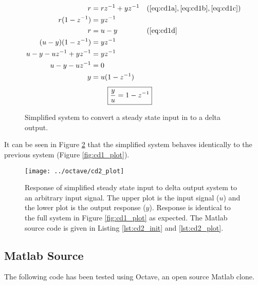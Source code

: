 \documentclass{article}
\begin{document}
\begin{align*}
	r &= r z^{-1} + y z^{-1} && (\ref{eq:cd1a}, \ref{eq:cd1b}, \ref{eq:cd1c})\\
	r(1 - z^{-1}) &= y z^{-1} \\
	r &= u - y && (\ref{eq:cd1d} \\
	(u - y)(1 - z^{-1}) &= y z^{-1} \\
	u - y - u z^{-1} + y z^{-1} &= y z^{-1} \\
	u - y - u z^{-1} &= 0 \\
	y &= u (1 - z^{-1})
\end{align*}
\begin{align}
	\Aboxed{ \frac{y}{u} &= 1 - z^{-1} }
\end{align}

\begin{figure}[!htbp]
\begin{center}


\end{center}
\caption{Simplified system to convert a steady state input in to
a delta output.}
\label{fig:cd1s}
\end{figure}

It can be seen in Figure \ref{fig:cd2_plot} that the simplified system
behaves identically to the previous system (Figure \ref{fig:cd1_plot}).

\begin{figure}[htbp!]
\texttt{[image: ../octave/cd2\_plot]}
\caption{Response of simplified steady state input to delta output system
to an arbitrary input signal.
The upper plot is the input signal ($u$) and the lower plot is
the output response ($y$).
Response is identical to the full system in Figure \ref{fig:cd1_plot}
as expected.
The Matlab source code is given in Listing \ref{lst:cd2_init}
and \ref{lst:cd2_plot}.
}
\label{fig:cd2_plot}
\end{figure}

\clearpage
\subsection{Matlab Source}
\label{app:cdsrc}

The following code has been tested using Octave\autocite{octave},
an open source Matlab clone.
\end{document}
